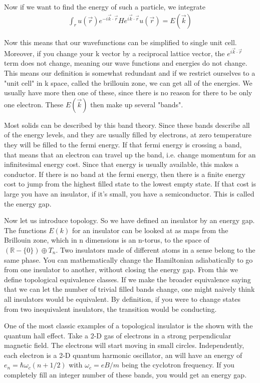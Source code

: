 Now if we want to find the energy of such a particle, we integrate  
\begin{align}
\int_r u(\vec{r}) e^{-i \vec{k} \cdot \vec{r}} H e^{i \vec{k} \cdot \vec{r}} u(\vec{r}) = E(\vec{k})
\end{align}

Now this means that our wavefunctions can be simplified to single unit cell. Moreover, if you change your k vector by a reciprocal lattice vector, the $e^{i \vec{k} \cdot \vec{r}}$ term does not change, meaning our wave functions and energies do not change. This means our definition is somewhat redundant and if we restrict ourselves to a "unit cell" in k space, called the brillouin zone, we can get all of the energies. We usually have more then one of these, since there is no reason for there to be only one electron. These $E(\vec{k})$ then make up several "bands".

Most solids can be described by this band theory. Since these bands describe all of the energy levels, and they are usually filled by electrons, at zero temperature they will be filled to the fermi energy. If that fermi energy is crossing a band, that means that an electron can travel up the band, i.e. change momentum for an infinitesimal energy cost. Since that energy is usually available, this makes a conductor. If there is no band at the fermi energy, then there is a finite energy cost to jump from the highest filled state to the lowest empty state. If that cost is large you have an insulator, if it's small, you have a semiconductor. This is called the energy gap. 

Now let us introduce topology. So we have defined an insulator by an energy gap. The functions $E(k)$ for an insulator can be looked at as maps from the Brillouin zone, which in n dimensions is an n-torus, to the space of $(\mathbb{R}-\{0\}) \oplus T_n $. Two insulators made of different atoms in a sense belong to the same phase. You can mathematically change the Hamiltonian adiabatically to go from one insulator to another, without closing the energy gap. From this we define topological equivalence classes. If we make the broader equivalence saying that we can let the number of trivial filled bands change, one might naively think all insulators would be equivalent. By definition, if you were to change states from two inequivalent insulators, the transition would be conducting. 

One of the most classic examples of a topological insulator is the shown with the quantum hall effect. Take a 2-D gas of electrons in a strong perpendicular magnetic field. The electrons will start moving in small circles. Independently, each electron is a 2-D quantum harmonic oscillator, an will have an energy of $e_n = \hbar \omega_c(n + 1/2)$ with $\omega_c = eB/m$ being the cyclotron frequency. If you completely fill an integer number of these bands, you would get an energy gap.


